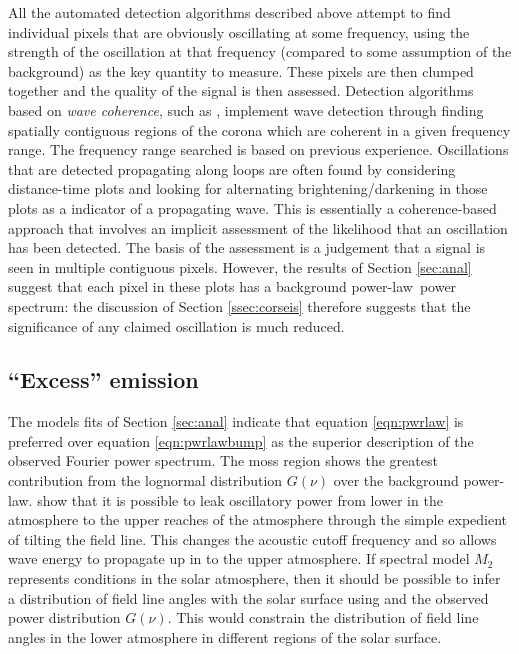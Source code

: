 \documentclass{aastex}
\newcommand{\PS}{power spectrum}
\newcommand{\PL}{power-law}
\begin{document}
All the automated detection algorithms described above attempt to find
individual pixels that are obviously oscillating at some frequency,
using the strength of the oscillation at that frequency (compared to
some assumption of the background) as the key quantity to measure.
These pixels are then clumped together and the quality of the signal
is then assessed.  Detection algorithms based on {\it wave coherence},
such as \cite{2008SoPh..252..321M}, implement wave detection through
finding spatially contiguous regions of the corona which are coherent
in a given frequency range.  The frequency range searched is based on
previous experience.  Oscillations that are detected propagating along
loops are often found by considering distance-time plots
\citep{2000AA...355L..23D, 2003AA...404L...1K} and looking for
alternating brightening/darkening in those plots as a indicator of a
propagating wave.  This is essentially a coherence-based approach that
involves an implicit assessment of the likelihood that an oscillation
has been detected.  The basis of the assessment is a judgement that a
signal is seen in multiple contiguous pixels.  However, the results of
Section \ref{sec:anal} suggest that each pixel in these plots has a
background \PL\ \PS: the discussion of Section \ref{ssec:corseis}
therefore suggests that the significance of any claimed oscillation is
much reduced.


\subsection{``Excess'' emission}\label{ssec:excess}
The models fits of Section \ref{sec:anal} indicate that equation
\ref{eqn:pwrlaw} is preferred over equation \ref{eqn:pwrlawbump} as
the superior description of the observed Fourier \PS. The
moss region shows the greatest contribution from the lognormal
distribution $G(\nu)$ over the background \PL.
\cite{2005ApJ...624L..61D} show that it is possible to leak
oscillatory power from lower in the atmosphere to the upper reaches of
the atmosphere through the simple expedient of tilting the field line.
This changes the acoustic cutoff frequency and so allows wave energy
to propagate up in to the upper atmosphere.  If spectral model $M_{2}$
represents conditions in the solar atmosphere, then it should be
possible to infer a distribution of field line angles with the solar
surface using \cite{2005ApJ...624L..61D} and the observed power
distribution $G(\nu)$.  This would constrain the distribution of field
line angles in the lower atmosphere in different regions of the solar
surface.
\end{document}

